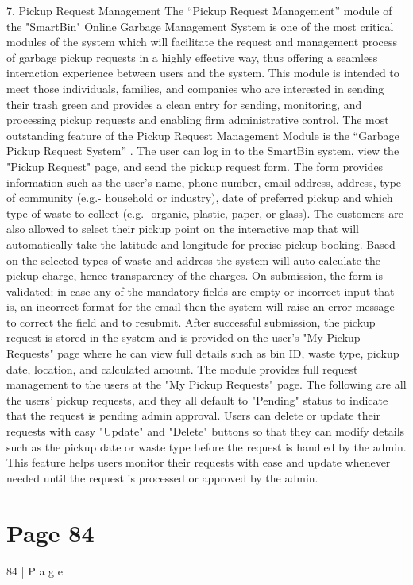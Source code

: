 \documentclass{article}
\begin{document}
 
7. Pickup Request Management 
The “Pickup Request Management” module of the "SmartBin" Online Garbage 
Management System is one of the most critical modules of the system which will facilitate 
the request and management process of garbage pickup requests in a highly effective way, 
thus offering a seamless interaction experience between users and the system. This 
module is intended to meet those individuals, families, and companies who are interested 
in sending their trash green and provides a clean entry for sending, monitoring, and 
processing pickup requests and enabling firm administrative control. 
The most outstanding feature of the Pickup Request Management Module is the “Garbage 
Pickup Request System” . The user can log in to the SmartBin system, view the "Pickup 
Request" page, and send the pickup request form. The form provides information such as 
the user's name, phone number, email address, address, type of community (e.g.- 
household or industry), date of preferred pickup and which type of waste to collect (e.g.- 
organic, plastic, paper, or glass). The customers are also allowed to select their pickup 
point on the interactive map that will automatically take the latitude and longitude for 
precise pickup booking. Based on the selected types of waste and address the system will 
auto-calculate the pickup charge, hence transparency of the charges. On submission, the 
form is validated; in case any of the mandatory fields are empty or incorrect input-that is, 
an incorrect format for the email-then the system will raise an error message to correct the 
field and to resubmit. After successful submission, the pickup request is stored in the 
system and is provided on the user's "My Pickup Requests" page where he can view full 
details such as bin ID, waste type, pickup date, location, and calculated amount. 
The module provides full request management to the users at the "My Pickup Requests" 
page. The following are all the users' pickup requests, and they all default to "Pending" 
status to indicate that the request is pending admin approval. Users can delete or update 
their requests with easy "Update" and "Delete" buttons so that they can modify details 
such as the pickup date or waste type before the request is handled by the admin. This 
feature helps users monitor their requests with ease and update whenever needed until the 
request is processed or approved by the admin. 

\section*{Page 84}
84 | P a g e 
 
\end{document}
